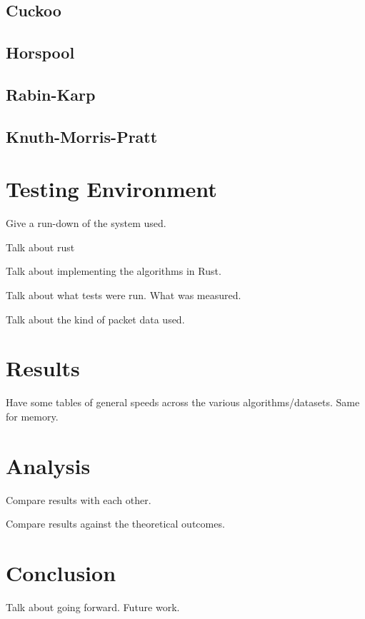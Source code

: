 \documentclass{article}
\begin{document}
\subsection{Cuckoo}
\cite{Fan2014}
\subsection{Horspool}
\cite{Horspool1980}
\subsection{Rabin-Karp}
\cite{Karp1987}
\subsection{Knuth-Morris-Pratt}
\cite{Knuth1977}

\section{Testing Environment}	
Give a run-down of the system used.

Talk about rust

Talk about implementing the algorithms in Rust.

Talk about what tests were run. What was measured.

Talk about the kind of packet data used. 


\section{Results}
Have some tables of general speeds across the various algorithms/datasets. Same for memory.

\section{Analysis}
Compare results with each other.

Compare results against the theoretical outcomes.

\section{Conclusion}
Talk about going forward. Future work.
\nocite{*}




\end{document}
